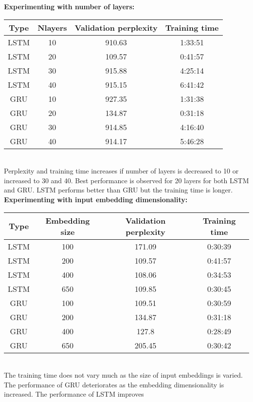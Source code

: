 \documentclass{article}
\begin{document}
\textbf{Experimenting with number of layers:}
\vspace{3pt}\\
\begin{tabular}[h]{cccc}
\hline Type	& Nlayers	& Validation perplexity	& Training time\\
\hline
LSTM	& 10 &	910.63	& 1:33:51\\
LSTM	&20	&109.57	&0:41:57\\
LSTM	&30	&915.88	&4:25:14\\
LSTM	&40	&915.15	&6:41:42\\
GRU	&10	&927.35	&1:31:38\\
GRU	&20	&134.87	&0:31:18\\
GRU	&30	&914.85	&4:16:40\\
GRU	&40	&914.17	&5:46:28\\
\hline
\end{tabular}
\vspace{4pt} \\

Perplexity and training time increases if number of layers is decreased to 10 or increased to 30 and 40. Best performance is observed for 20 layers for both LSTM and GRU. LSTM performs better than GRU but the training time is longer.\\

\textbf{Experimenting with input embedding dimensionality:}
\vspace{3pt} \\
\begin{tabular}[h]{cccc}
\hline Type &	Embedding size	&Validation perplexity	&Training time\\
\hline
LSTM	&100	&171.09	&0:30:39\\
LSTM	&200	&109.57	&0:41:57\\
LSTM	&400	&108.06	&0:34:53\\
LSTM	&650	&109.85	&0:30:45\\
GRU	    &100	&109.51	&0:30:59\\
GRU	    &200	&134.87	&0:31:18\\
GRU	    &400	&127.8	&0:28:49\\
GRU	    &650	&205.45	&0:30:42\\
\hline
\end{tabular}
\vspace{5pt} \\

The training time does not vary much as the size of input embeddings is varied. The performance of GRU deteriorates as the embedding dimensionality is increased. The performance of LSTM improves 
\end{document}
